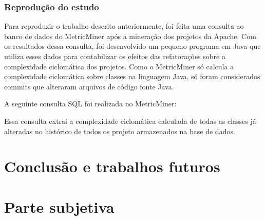 \documentclass[a4paper, 12pt, twoside]{book}
\begin{document}
        \subsection*{Reprodução do estudo}
        Para reproduzir o trabalho descrito anteriormente, foi feita uma consulta ao banco de dados do MetricMiner após a mineração dos projetos da Apache. Com os resultados dessa consulta, foi desenvolvido um pequeno programa em Java que utiliza esses dados para contabilizar os efeitos das refatorações sobre a complexidade ciclomática dos projetos. Como o MetricMiner só calcula a complexidade ciclomática sobre classes na linguagem Java, só foram considerados commits que alteraram arquivos de código fonte Java.

        A seguinte consulta SQL foi realizada no MetricMiner:

        

        Essa consulta extrai a complexidade ciclomática calculada de todas as classes já alteradas no histórico de todos os projeto armazenados na base de dados.


\chapter{Conclusão e trabalhos futuros} \label{ch:conclusao}

\chapter{Parte subjetiva} \label{ch:subjetiva}



\end{document}
